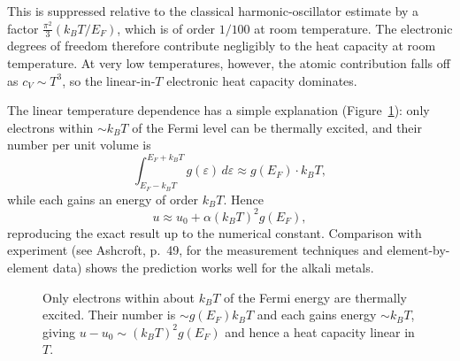 This is suppressed relative to the classical harmonic-oscillator estimate by a factor $\frac{\pi^2}{3}(k_BT/E_F)$, which is of order $1/100$ at room temperature. The electronic degrees of freedom therefore contribute negligibly to the heat capacity at room temperature. At very low temperatures, however, the atomic contribution falls off as $c_V \sim T^3$, so the linear-in-$T$ electronic heat capacity dominates.

The linear temperature dependence has a simple explanation (Figure~\ref{fig:drude-smearing}): only electrons within $\sim k_BT$ of the Fermi level can be thermally excited, and their number per unit volume is
\begin{equation}
    \int_{E_F - k_BT}^{E_F + k_BT} g(\varepsilon)\,d\varepsilon \approx g(E_F)\cdot k_BT,
\end{equation}
while each gains an energy of order $k_BT$. Hence
\begin{equation}
    u \approx u_0 + \alpha (k_BT)^2 g(E_F),
\end{equation}
reproducing the exact result up to the numerical constant. Comparison with experiment (see Ashcroft, p.~49, for the measurement techniques and element-by-element data) shows the prediction works well for the alkali metals.

\begin{figure}[ht]
    \centering
    \caption{Only electrons within about $k_BT$ of the Fermi energy are thermally excited. Their number is $\sim g(E_F)k_BT$ and each gains energy $\sim k_BT$, giving $u - u_0 \sim (k_BT)^2 g(E_F)$ and hence a heat capacity linear in $T$.}
    \label{fig:drude-smearing}
\end{figure}

